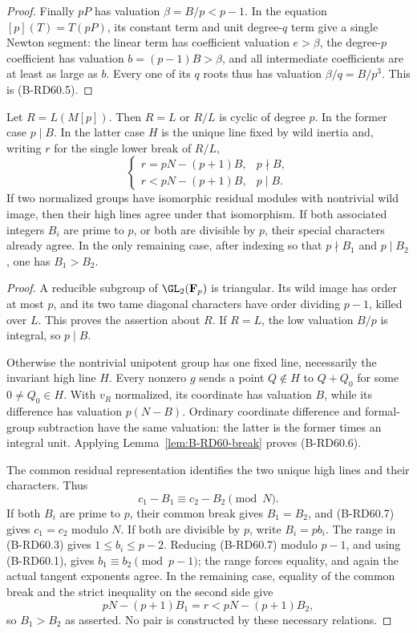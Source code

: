 \begin{proof}
Finally $pP$ has valuation $\beta=B/p<p-1$. In the equation
$[p](T)=T(pP)$, its constant term and unit degree-$q$ term give a
single Newton segment: the linear term has coefficient valuation
$e>\beta$, the degree-$p$ coefficient has valuation
$b=(p-1)B>\beta$, and all intermediate coefficients are at least
as large as $b$. Every one of its $q$ roots thus has valuation
$\beta/q=B/p^3$. This is (B-RD60.5).
\end{proof}

\begin{proposition}
\label{prop:B-RD60-residual-break}
Let $R=L(M[p])$. Then $R=L$ or $R/L$ is cyclic of degree $p$.
In the former case $p\mid B$. In the latter case $H$ is the unique
line fixed by wild inertia and, writing $r$ for the single lower
break of $R/L$,
\[
 \begin{cases}
 r=pN-(p+1)B,&p\nmid B,\\
 r<pN-(p+1)B,&p\mid B.
 \end{cases}                                          \tag{B-RD60.6}
\]
If two normalized groups have isomorphic residual modules with
nontrivial wild image, then their high lines agree under that
isomorphism. If both associated integers $B_i$ are prime to $p$,
or both are divisible by $p$, their special characters already
agree. In the only remaining case, after indexing so that
$p\nmid B_1$ and $p\mid B_2$, one has $B_1>B_2$.
\end{proposition}
\begin{proof}
A reducible subgroup of $\GL_2(\mathbf F_p)$ is triangular. Its
wild image has order at most $p$, and its two tame diagonal
characters have order dividing $p-1$, killed over $L$. This proves
the assertion about $R$. If $R=L$, the low valuation $B/p$ is
integral, so $p\mid B$.

Otherwise the nontrivial unipotent group has one fixed line,
necessarily the invariant high line $H$. Every nonzero $g$ sends
a point $Q\notin H$ to $Q+Q_0$ for some $0\ne Q_0\in H$.
With $v_R$ normalized, its coordinate has valuation $B$, while
its difference has valuation $p(N-B)$. Ordinary coordinate
difference and formal-group subtraction have the same valuation:
the latter is the former times an integral unit. Applying
Lemma~\ref{lem:B-RD60-break} proves (B-RD60.6).

The common residual representation identifies the two unique high
lines and their characters. Thus
\[
                   c_1-B_1\equiv c_2-B_2\pmod N.       \tag{B-RD60.7}
\]
If both $B_i$ are prime to $p$, their common break gives $B_1=B_2$,
and (B-RD60.7) gives $c_1=c_2$ modulo $N$.
If both are divisible by $p$, write $B_i=pb_i$.
The range in (B-RD60.3) gives $1\le b_i\le p-2$.
Reducing (B-RD60.7) modulo $p-1$, and using (B-RD60.1), gives
$b_1\equiv b_2\pmod{p-1}$; the range forces equality, and again
the actual tangent exponents agree.
In the remaining case, equality of the common break and the strict
inequality on the second side give
\[
      pN-(p+1)B_1=r<pN-(p+1)B_2,
\]
so $B_1>B_2$ as asserted. No pair is constructed by these necessary
relations.
\end{proof}
